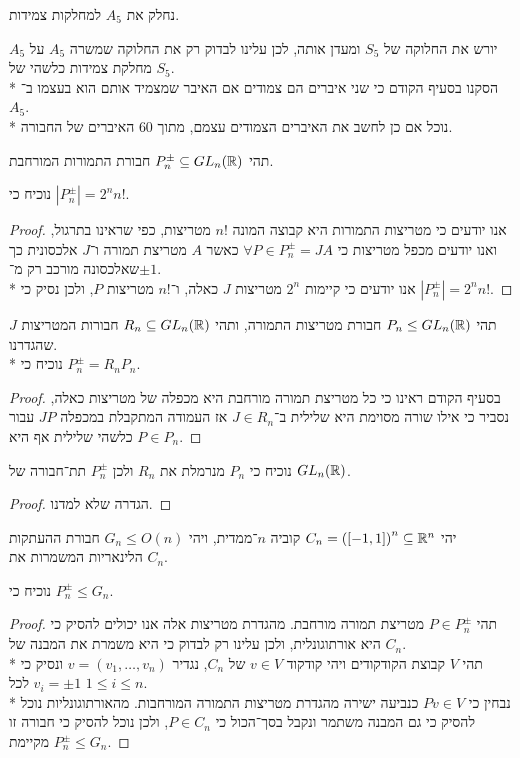 \Subquestion{}
נחלק את $A_5$ למחלקות צמידות.

$A_5$ יורש את החלוקה של $S_5$ ומעדן אותה, לכן עלינו לבדוק רק את החלוקה שמשרה $A_5$ על מחלקת צמידות כלשהי של $S_5$. \\*
הסקנו בסעיף הקודם כי שני איברים הם צמודים אם האיבר שמצמיד אותם הוא בעצמו ב־$A_5$. \\*
נוכל אם כן לחשב את האיברים הצמודים עצמם, מתוך 60 האיברים של החבורה.

\Question{}
תהי $P_n^\pm \subseteq GL_n(\mathbb{R})$ חבורת התמורות המורחבת.

\Subquestion{}
נוכיח כי $|P_n^\pm| = 2^n n! $.
\begin{proof}
	אנו יודעים כי מטריצות התמורות היא קבוצה המונה $n! $ מטריצות, כפי שראינו בתרגול, ואנו יודעים מכפל מטריצות כי $\forall P \in P_n^\pm = J A$ כאשר $A$ מטריצת תמורה ו־$J$ אלכסונית כך שאלכסונה מורכב רק מ־$\pm1$. \\*
	אנו יודעים כי קיימות $2^n$ מטריצות $J$ כאלה, ו־$n! $ מטריצות $P$, ולכן נסיק כי $|P_n^\pm| = 2^n n! $.
\end{proof}

\Subquestion{}
תהי $P_n \le GL_n(\mathbb{R})$ חבורת מטריצות התמורה, ותהי $R_n \subseteq GL_n(\mathbb{R})$ חבורות המטריצות $J$ שהגדרנו. \\*
נוכיח כי $P_n^\pm = R_n P_n$.
\begin{proof}
	בסעיף הקודם ראינו כי כל מטריצת תמורה מורחבת היא מכפלה של מטריצות כאלה, נסביר כי אילו שורה מסוימת היא שלילית ב־$J \in R_n$ אז העמודה המתקבלת במכפלה $J P$ עבור $P \in P_n$ כלשהי שלילית אף היא.
\end{proof}

\Subquestion{}
נוכיח כי $P_n$ מנרמלת את $R_n$ ולכן $P_n^\pm$ תת־חבורה של $GL_n(\mathbb{R})$.
\begin{proof}
	הגדרה שלא למדנו.
\end{proof}

\Question{}
יהי $C_n = {([-1, 1])}^n \subseteq \mathbb{R}^n$ קוביה $n$־ממדית, ויהי $G_n \le O(n)$ חבורת ההעתקות הלינאריות המשמרות את $C_n$.

\Subquestion{}
נוכיח כי $P_n^\pm \le G_n$.
\begin{proof}
	תהי $P \in P_n^\pm$ מטריצת תמורה מורחבת. מהגדרת מטריצות אלה אנו יכולים להסיק כי היא אורתוגונלית, ולכן עלינו רק לבדוק כי היא משמרת את המבנה של $C_n$. \\*
	תהי $V$ קבוצת הקודקודים ויהי קודקוד $v \in V$ של $C_n$, נגדיר $v = (v_1, \dots, v_n)$ ונסיק כי $v_i = \pm 1$ לכל $1 \le i \le n$. \\*
	נבחין כי $P v \in V$ כנביעה ישירה מהגדרת מטריצות התמורה המורחבות.
	מהאורתוגונליות נוכל להסיק כי גם המבנה משתמר ונקבל בסך־הכול כי $P \in C_n$, ולכן נוכל להסיק כי חבורה זו מקיימת $P_n^\pm \le G_n$.
\end{proof}

